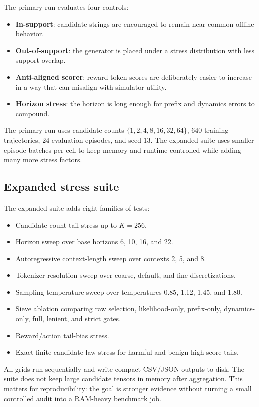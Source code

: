 \documentclass{article}
\begin{document}
The primary run evaluates four controls:
\begin{itemize}
\item \textbf{In-support}: candidate strings are encouraged to remain near common offline behavior.
\item \textbf{Out-of-support}: the generator is placed under a stress distribution with less support overlap.
\item \textbf{Anti-aligned scorer}: reward-token scores are deliberately easier to increase in a way that can misalign with simulator utility.
\item \textbf{Horizon stress}: the horizon is long enough for prefix and dynamics errors to compound.
\end{itemize}
The primary run uses candidate counts \(\{1,2,4,8,16,32,64\}\), 640 training trajectories, 24 evaluation episodes, and seed 13. The expanded suite uses smaller episode batches per cell to keep memory and runtime controlled while adding many more stress factors.

\subsection{Expanded stress suite}

The expanded suite adds eight families of tests:
\begin{itemize}
\item Candidate-count tail stress up to \(K=256\).
\item Horizon sweep over base horizons 6, 10, 16, and 22.
\item Autoregressive context-length sweep over contexts 2, 5, and 8.
\item Tokenizer-resolution sweep over coarse, default, and fine discretizations.
\item Sampling-temperature sweep over temperatures 0.85, 1.12, 1.45, and 1.80.
\item Sieve ablation comparing raw selection, likelihood-only, prefix-only, dynamics-only, full, lenient, and strict gates.
\item Reward/action tail-bias stress.
\item Exact finite-candidate law stress for harmful and benign high-score tails.
\end{itemize}
All grids run sequentially and write compact CSV/JSON outputs to disk. The suite does not keep large candidate tensors in memory after aggregation. This matters for reproducibility: the goal is stronger evidence without turning a small controlled audit into a RAM-heavy benchmark job.
\end{document}
